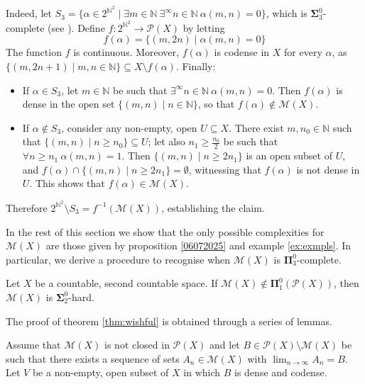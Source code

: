 \documentclass{lmcs}
\newcommand{\N}{\mathbb N}
\newcommand{\bsigma}{\boldsymbol\Sigma}
\newcommand{\bpi}{\boldsymbol\Pi}
\begin{document}
\begin{exa}
\begin{enumerate}
Indeed, let $S_3=\{\alpha\in 2^{ \N^2}\mid\exists m\in \N \ \exists^{\infty }n\in \N \ \alpha (m,n)=0\} $, which is $ \bsigma^0_3$-complete (see \cite[\S 23.A]{Kechris1995}).
Define $f:2^{ \N^2}\to \mathcal P (X)$ by letting
\[
f(\alpha )=\{ (m,2n)\mid\alpha (m,n)=0\}
\]
The function $f$ is continuous.
Moreover, $f(\alpha )$ is codense in $X$ for every $\alpha $, as $\{ (m,2n+1)\mid m,n\in \N \}\subseteq X\setminus f(\alpha )$.
Finally:
\begin{itemize}
\item If $\alpha\in S_3$, let $m\in \N $ be such that $\exists^{\infty }n\in \N \ \alpha (m,n)=0$.
Then $f(\alpha )$ is dense in the open set $\{ (m,n)\mid n\in \N \} $, so that $f(\alpha )\notin \mathcal M (X)$.
\item If $\alpha\notin S_3$, consider any non-empty, open $U\subseteq X$. There exist $m,n_0\in \N $ such that $\{ (m,n)\mid n\geqslant n_0\}\subseteq U$; let also $n_1\geqslant \frac{n_0}2 $ be such that $\forall n\geqslant n_1\ \alpha (m,n)=1$.
Then $\{ (m,n)\mid n\geqslant 2n_1\} $ is an open subset of $U$, and $f(\alpha )\cap\{ (m,n)\mid n\geqslant 2n_1\} =\emptyset $, witnessing that $f(\alpha )$ is not dense in $U$.
This shows that $f(\alpha )\in \mathcal M (X)$.
\end{itemize}
Therefore $2^{ \N^2}\setminus S_3=f^{-1}( \mathcal M (X))$, establishing the claim.
\end{enumerate}
\end{exa}

In the rest of this section we show that the only possible complexities for $ \mathcal M (X)$ are those given by proposition \ref{06072025} and example \ref{ex:exmpls}.
In particular, we derive a procedure to recognise when $ \mathcal M (X)$ is $ \bpi^0_3$-complete.

\begin{thm} \label{thm:wishful}
Let $X$ be a countable, second countable space.
If $ \mathcal M(X)\notin \bpi^0_1( \mathcal P (X))$, then $ \mathcal M (X)$ is $ \bsigma^0_2$-hard.
\end{thm}

The proof of theorem \ref{thm:wishful} is obtained through a series of lemmas.

Assume that $ \mathcal M (X)$ is not closed in $ \mathcal P (X)$ and let $B\in \mathcal P (X)\setminus \mathcal M (X)$ be such that there exists a sequence of sets $A_n\in \mathcal M (X)$ with $\lim_{n\rightarrow\infty }A_n=B$.
Let $V$ be a non-empty, open subset of $X$ in which $B$ is dense and codense.
\end{document}
